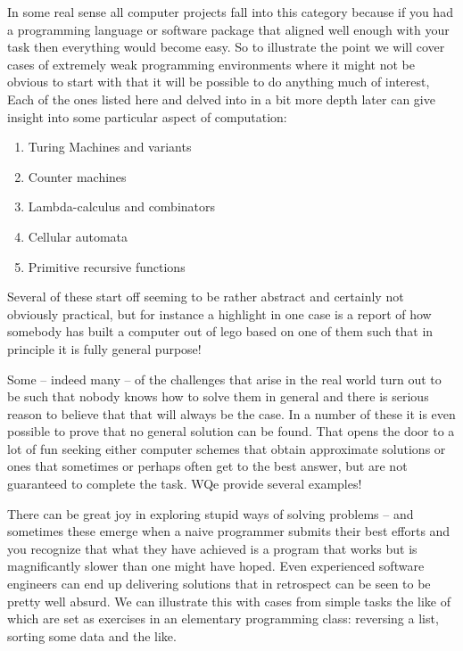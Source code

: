 \begin{longdescription}
\item[Constraints that rule out obvious approaches]

In some real sense all computer projects fall into this category because 
if you had a programming language or software package that aligned well 
enough with your task then everything would become easy. So to illustrate 
the point we will cover cases of extremely weak programming environments 
where it might not be obvious to start with that it will be possible to do
anything much of interest, Each of the ones listed here and delved into 
in a bit more depth later can give insight into some particular aspect of 
computation:
\begin{enumerate}
   \item Turing Machines and variants
   \item Counter machines
   \item Lambda-calculus and combinators
   \item Cellular automata
   \item Primitive recursive functions
\end{enumerate}
Several of these start off seeming to be rather abstract and certainly not
obviously practical, but for instance a highlight in one case is a report 
of how somebody has built a computer out of lego based on one of them such 
that in principle it is fully general purpose!

\item[Seek good partial solutions to intractable problems]

Some -- indeed many -- of the challenges that arise in the real world turn
out to be such that nobody knows how to solve them in general and there is
serious reason to believe that that will always be the case. In a number 
of these it is even possible to prove that no general solution can be 
found. That opens the door to a lot of fun seeking either computer schemes
that obtain approximate solutions or ones that sometimes or perhaps often 
get to the best answer, but are not guaranteed to complete the task. WQe 
provide several examples!

\item[Use wilfully perverse techniques that achieve your goal.]

There can be great joy in exploring stupid ways of solving problems -- and 
sometimes these emerge when a naive programmer submits their best efforts 
and you recognize that what they have achieved is a program that works but 
is magnificantly slower than one might have hoped. Even experienced
software engineers can end up delivering solutions that in retrospect can 
be seen to be pretty well absurd. We can illustrate this with cases from
simple tasks the like of which are set as exercises in an elementary 
programming class: reversing a list, sorting some data and the like.


\end{longdescription}
